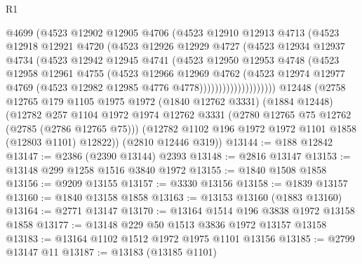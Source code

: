 \begin{lexlean}{R1}
\begin{coremodule}
                      @4699
                      (@4523
                        @12902
                        @12905
                        @4706
                        (@4523
                          @12910
                          @12913
                          @4713
                          (@4523
                            @12918
                            @12921
                            @4720
                            (@4523
                              @12926
                              @12929
                              @4727
                              (@4523
                                @12934
                                @12937
                                @4734
                                (@4523
                                  @12942
                                  @12945
                                  @4741
                                  (@4523
                                    @12950
                                    @12953
                                    @4748
                                    (@4523
                                      @12958
                                      @12961
                                      @4755
                                      (@4523
                                        @12966
                                        @12969
                                        @4762
                                        (@4523
                                          @12974
                                          @12977
                                          @4769
                                          (@4523 @12982 @12985 @4776 @4778))))))))))))))))))))
    @12448
    (@2758
      @12765
      @179
      @1105
      @1975
      @1972
      (@1840 @12762 @3331)
      (@1884 @12448)
      (@12782
        @257
        @1104
        @1972
        @1974
        @12762
        @3331
        (@2780 @12765 @75 @12762 (@2785 (@2786 @12765 @75)))
        (@12782 @1102 @196 @1972 @1972 @1101 @1858 (@12803 @1101) @12822))
      (@2810 @12446 @319))
@13144 := @188 @12842
@13147 := @2386 (@2390 @13144) @2393
@13148 := @2816 @13147
@13153 := @13148 @299 @1258 @1516 @3840 @1972
@13155 := @1840 @1508 @1858
@13156 := @9209 @13155
@13157 := @3330 @13156
@13158 := @1839 @13157
@13160 := @1840 @13158 @1858
@13163 := @13153 @13160 (@1883 @13160)
@13164 := @2771 @13147
@13170 := @13164 @1514 @196 @3838 @1972 @13158 @1858
@13177 := @13148 @229 @50 @1513 @3836 @1972 @13157 @13158
@13183 := @13164 @1102 @1512 @1972 @1975 @1101 @13156
@13185 := @2799 @13147 @11
@13187 := @13183 (@13185 @1101)

\end{coremodule}
\end{lexlean}
